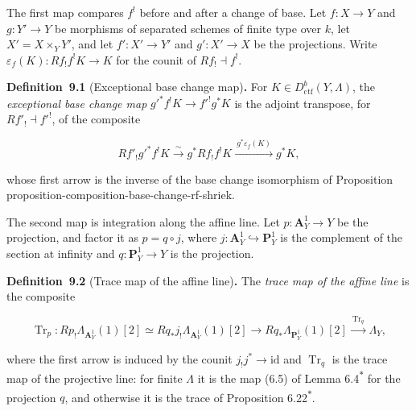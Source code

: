 \documentclass[11pt]{article}
\newenvironment{bpstatement}[2]{\par\addvspace{0.6\baselineskip}\noindent\textbf{#1}#2\textbf{.}\enspace\ignorespaces}
  {\par\addvspace{0.4\baselineskip}}
\newcommand{\bpout}[1]{#1\textsuperscript{\hyperlink{bp-outside}{\ensuremath{\ast}}}}
\begin{document}
The first map compares \(f^!\) before and after a change of base. Let \(f:X\to Y\) and \(g:Y'\to Y\) be morphisms of separated schemes of finite type over \(k\), let \(X'=X\times_YY'\), and let \(f':X'\to Y'\) and \(g':X'\to X\) be the projections. Write \(\varepsilon_f(K):Rf_!f^!K\to K\) for the counit of \(Rf_!\dashv f^!\).

\label{bp7}%
\begin{bpstatement}{Definition~9.1}{ (Exceptional base change map)}
For \(K\in D^b_{\mathrm{ctf}}(Y,\Lambda)\), the \emph{exceptional base change map} \(g'^*f^!K\to f'^!g^*K\) is the adjoint transpose, for \(Rf'_!\dashv f'^!\), of the composite

\[
Rf'_!g'^*f^!K\xrightarrow{\sim}g^*Rf_!f^!K
\xrightarrow{\ g^*\varepsilon_f(K)\ }g^*K,
\]

whose first arrow is the inverse of the base change isomorphism of Proposition proposition-composition-base-change-rf-shriek.
\end{bpstatement}

\label{bp8}%
The second map is integration along the affine line. Let \(p:\mathbf A^1_Y\to Y\) be the projection, and factor it as \(p=q\circ j\), where \(j:\mathbf A^1_Y\hookrightarrow\mathbf P^1_Y\) is the complement of the section at infinity and \(q:\mathbf P^1_Y\to Y\) is the projection.

\label{bp9}%
\begin{bpstatement}{Definition~9.2}{ (Trace map of the affine line)}
The \emph{trace map of the affine line} is the composite

\[
\operatorname{Tr}_p:Rp_!\Lambda_{\mathbf A^1_Y}(1)[2]
\simeq Rq_*j_!\Lambda_{\mathbf A^1_Y}(1)[2]
\longrightarrow Rq_*\Lambda_{\mathbf P^1_Y}(1)[2]
\xrightarrow{\ \operatorname{Tr}_q\ }\Lambda_Y,
\tag{9.1}
\]

where the first arrow is induced by the counit \(j_!j^*\to\mathrm{id}\) and \(\operatorname{Tr}_q\) is the trace map of the projective line: for finite \(\Lambda\) it is the map (6.5) of Lemma \bpout{6.4} for the projection \(q\), and otherwise it is the trace of Proposition \bpout{6.22}.
\end{bpstatement}
\end{document}
